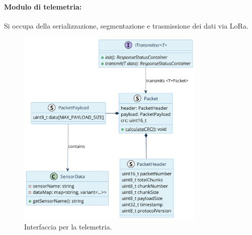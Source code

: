 \documentclass[12pt,a4paper,twoside]{book}
\begin{document}
\newpage
\paragraph{\textbf{Modulo di telemetria:}}Si occupa della serializzazione, segmentazione
e trasmissione dei dati via \ac{LoRa}.
\begin{figure}[H]
    \centering
    \includegraphics[width=0.8\textwidth]{img/uml/transmitter.png}
    \caption{Interfaccia per la telemetria.}
    \label{fig:flight-computer-telemetry}
\end{figure}
\newpage
\end{document}
